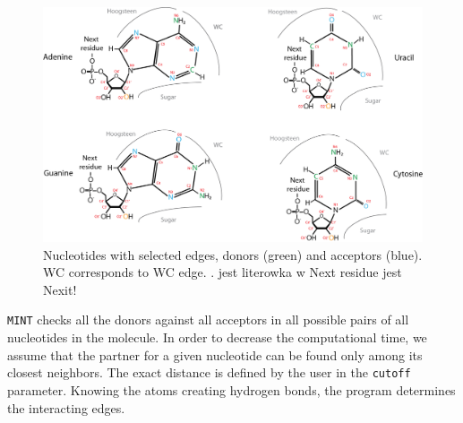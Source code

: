 \documentclass[12pt]{article}
\begin{document}
\begin{figure}[h!]
\centering
\includegraphics[width = 14cm]{./pictures/donors_acceptors_nucleotides.png}
\caption{Nucleotides with selected edges, donors (green) and acceptors (blue). WC corresponds to WC edge.  \cite{Lescoute2006}. {\color{red} jest literowka w Next residue jest Nexit!}}
\label{Edges}
\end{figure}

{\tt MINT} checks all the donors against all acceptors in all possible pairs of all nucleotides in the molecule. In order to decrease the computational time, we assume that the partner for a given nucleotide can be found only among its closest neighbors. The exact distance is defined by the user in the {\tt cutoff} parameter. Knowing the atoms creating hydrogen bonds, the program  determines the interacting edges.
\end{document}
